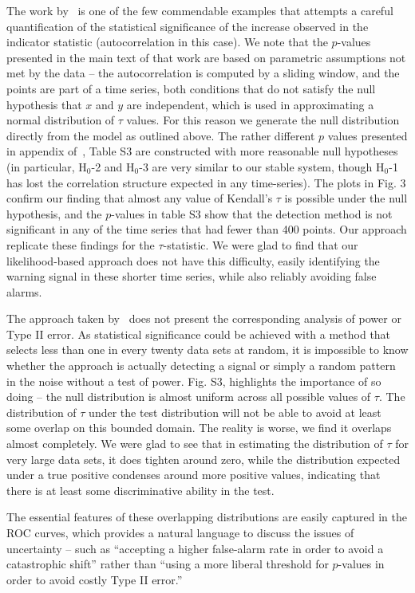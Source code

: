 \documentclass[authoryear,preprint,11pt]{elsarticle}
\begin{document}
The work by~\citet{Dakos2008} is one of the few commendable examples that attempts a careful quantification of the statistical significance of the increase observed in the indicator statistic (autocorrelation in this case).  We note that the $p$-values presented in the main text of that work are based on parametric assumptions not met by the data -- the autocorrelation is computed by a sliding window, and the points are part of a time series, both conditions that do not satisfy the null hypothesis that $x$ and $y$ are independent, which is used in approximating a normal distribution of $\tau$ values.  For this reason we generate the null distribution directly from the model as outlined above.   The rather different $p$ values presented in appendix of~\citet{Dakos2008}, Table S3 are constructed with more reasonable null hypotheses (in particular, H$_0$-2 and H$_0$-3 are very similar to our stable system, though H$_0$-1 has lost the correlation structure expected in any time-series).  The plots in Fig. 3 confirm our finding that almost any value of Kendall's $\tau$ is possible under the null hypothesis, and the $p$-values in table S3 show that the detection method is not significant in any of the time series that had fewer than 400 points.  Our approach replicate these findings for the $\tau$-statistic.  We were glad to find that our likelihood-based approach does not have this difficulty, easily identifying the warning signal in these shorter time series, while also reliably avoiding false alarms.  

The approach taken by~\citet{Dakos2008} does not present the corresponding analysis of power or Type II error.  As statistical significance could be achieved with a method that selects less than one in every twenty data sets at random, it is impossible to know whether the approach is actually detecting a signal or simply a random pattern in the noise without a test of power.  Fig. S3, highlights the importance of so doing -- the null distribution is almost uniform across all possible values of $\tau$.  The distribution of $\tau$ under the test distribution will not be able to avoid at least some overlap on this bounded domain.  The reality is worse, we find it overlaps almost completely.  We were glad to see that in estimating the distribution of $\tau$ for very large data sets, it does tighten around zero, while the distribution expected under a true positive condenses around more positive values, indicating that there is at least some discriminative ability in the test. 

The essential features of these overlapping distributions are easily captured in the ROC curves, which provides a natural language to discuss the issues of uncertainty -- such as ``accepting a higher false-alarm rate in order to avoid a catastrophic shift'' rather than ``using a more liberal threshold for $p$-values in order to avoid costly Type II error.''  
\end{document}
